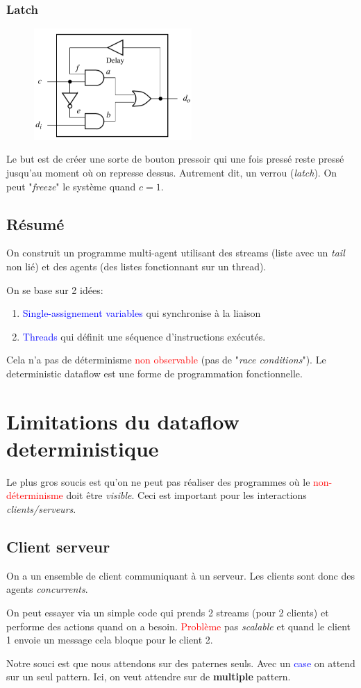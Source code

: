 \documentclass{report}
\begin{document}
\subsubsection{Latch}
\begin{figure}[H]
\centering
\includegraphics[width=6cm]{img/latch.png}
\end{figure}
Le but est de créer une sorte de bouton pressoir qui une fois pressé reste pressé jusqu'au moment où on represse dessus. Autrement dit, un verrou (\textit{latch}). On peut "\textit{freeze}" le système quand $c = 1$.

\subsection{Résumé}
On construit un programme multi-agent utilisant des streams (liste avec un \textit{tail} non lié) et des agents (des listes fonctionnant sur un thread).\par
On se base sur 2 idées:
\begin{enumerate}
\item \textcolor{blue}{Single-assignement variables} qui synchronise à la liaison
\item \textcolor{blue}{Threads} qui définit une séquence d'instructions exécutés.
\end{enumerate}
Cela n'a pas de déterminisme \textcolor{red}{non observable} (pas de "\textit{race conditions}"). Le deterministic dataflow est une forme de programmation fonctionnelle.

\section{Limitations du dataflow deterministique}
Le plus gros soucis est qu'on ne peut pas réaliser des programmes où le \textcolor{red}{non-déterminisme } doit être \textit{visible}. Ceci est important pour les interactions \textit{clients/serveurs}.

\subsection{Client serveur}
On a un ensemble de client communiquant à un serveur. Les clients sont donc des agents \textit{concurrents}. \par 
On peut essayer via un simple code qui prends 2 streams (pour 2 clients) et performe des actions quand on a besoin. \textcolor{red}{Problème} pas \textit{scalable} et quand le client 1 envoie un message cela bloque pour le client 2.\par 
Notre souci est que nous attendons sur des paternes seuls. Avec un \textcolor{blue}{case} on attend sur un seul pattern. Ici, on veut attendre sur de \textbf{multiple} pattern.
\end{document}
